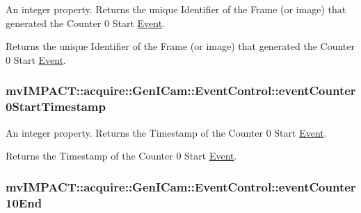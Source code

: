 An integer property. Returns the unique Identifier of the Frame (or image) that generated the Counter 0 Start \hyperlink{classmv_i_m_p_a_c_t_1_1acquire_1_1_event}{Event}. 

Returns the unique Identifier of the Frame (or image) that generated the Counter 0 Start \hyperlink{classmv_i_m_p_a_c_t_1_1acquire_1_1_event}{Event}. \hypertarget{classmv_i_m_p_a_c_t_1_1acquire_1_1_gen_i_cam_1_1_event_control_a7aed8bb646dd9e3ea44e03d100cd467d}{
\subsubsection[{event\+Counter0\+Start\+Timestamp}]{ mv\+I\+M\+P\+A\+C\+T\+::acquire\+::\+Gen\+I\+Cam\+::\+Event\+Control\+::event\+Counter0\+Start\+Timestamp}}\label{classmv_i_m_p_a_c_t_1_1acquire_1_1_gen_i_cam_1_1_event_control_a7aed8bb646dd9e3ea44e03d100cd467d}


An integer property. Returns the Timestamp of the Counter 0 Start \hyperlink{classmv_i_m_p_a_c_t_1_1acquire_1_1_event}{Event}. 

Returns the Timestamp of the Counter 0 Start \hyperlink{classmv_i_m_p_a_c_t_1_1acquire_1_1_event}{Event}. \hypertarget{classmv_i_m_p_a_c_t_1_1acquire_1_1_gen_i_cam_1_1_event_control_ab16c68b8130080d359047068a84225ce}{
\subsubsection[{event\+Counter10\+End}]{ mv\+I\+M\+P\+A\+C\+T\+::acquire\+::\+Gen\+I\+Cam\+::\+Event\+Control\+::event\+Counter10\+End}}\label{classmv_i_m_p_a_c_t_1_1acquire_1_1_gen_i_cam_1_1_event_control_ab16c68b8130080d359047068a84225ce}


